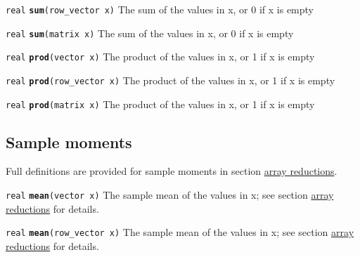 \documentclass[
  10pt,
]{book}
\begin{document}

\texttt{real} \textbf{\texttt{sum}}\texttt{(row\_vector\ x)}\newline
The sum of the values in x, or 0 if x is empty


\texttt{real} \textbf{\texttt{sum}}\texttt{(matrix\ x)}\newline
The sum of the values in x, or 0 if x is empty


\texttt{real} \textbf{\texttt{prod}}\texttt{(vector\ x)}\newline
The product of the values in x, or 1 if x is empty


\texttt{real} \textbf{\texttt{prod}}\texttt{(row\_vector\ x)}\newline
The product of the values in x, or 1 if x is empty


\texttt{real} \textbf{\texttt{prod}}\texttt{(matrix\ x)}\newline
The product of the values in x, or 1 if x is empty

\hypertarget{sample-moments}{%
\subsection{Sample moments}\label{sample-moments}}

Full definitions are provided for sample moments in section
\protect\hyperlink{array-reductions}{array reductions}.


\texttt{real} \textbf{\texttt{mean}}\texttt{(vector\ x)}\newline
The sample mean of the values in x; see section
\protect\hyperlink{array-reductions}{array reductions} for details.


\texttt{real} \textbf{\texttt{mean}}\texttt{(row\_vector\ x)}\newline
The sample mean of the values in x; see section
\protect\hyperlink{array-reductions}{array reductions} for details.
\end{document}
